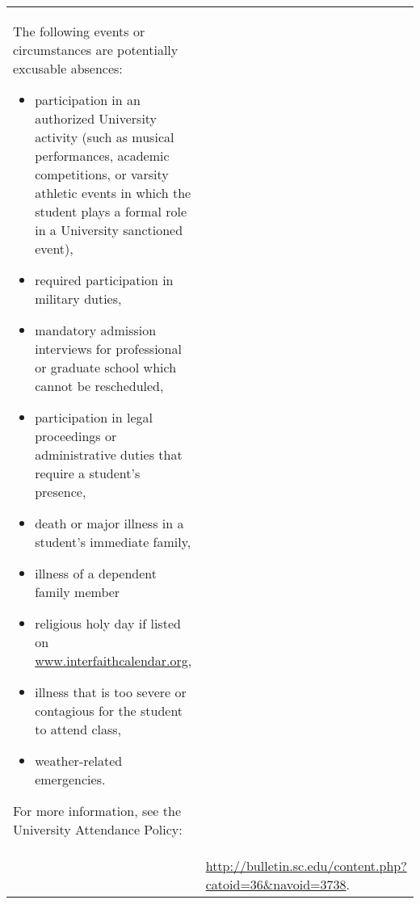 \documentclass[10pt]{amsart}
\begin{document}
\begin{tabular}{p{1.4in}p{5in}}
  The following events or circumstances are potentially excusable absences:
  \begin{itemize}
  \item
    participation in an authorized University activity (such as musical performances, academic competitions, or varsity athletic events in which the student plays a formal role in a University sanctioned event),
  \item
    required participation in military duties,
  \item
    mandatory admission interviews for professional or graduate school which cannot be rescheduled,
  \item
    participation in legal proceedings or administrative duties that require a student's presence,
  \item
    death or major illness in a student’s immediate family,
  \item
    illness of a dependent family member
  \item
    religious holy day if listed on \url{www.interfaithcalendar.org},
  \item
    illness that is too severe or contagious for the student to attend class,
  \item
    weather-related emergencies.
  \end{itemize}
  For more information, see the University Attendance Policy: \\
  &\url{http://bulletin.sc.edu/content.php?catoid=36\&navoid=3738}.
\end{tabular}
\end{document}
